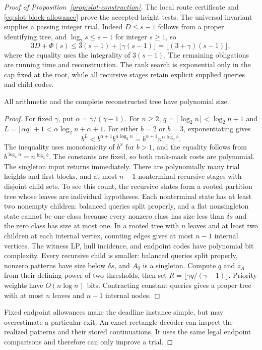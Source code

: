 \begin{proof}[Proof of Proposition~\ref{prop:slot-construction}]
The local route certificate and \eqref{eq:slot-block-allowance} prove
the accepted-height tests. The universal invariant supplies a passing
integer trial. Indeed $D\le s-1$ follows from a proper identifying
tree, and $\log_2s\le s-1$ for integer $s\ge1$, so
\[
 3D+\Phi(s)
 \le3(s-1)+\lfloor\gamma(s-1)\rfloor
 =\lfloor(3+\gamma)(s-1)\rfloor,
\]
where the equality uses the integrality of $3(s-1)$.
The remaining obligations are running time and reconstruction. The
rank search is exponential only in the cap fixed at the root, while
all recursive stages retain explicit supplied queries and child codes.

\begin{claim}
All arithmetic and the complete reconstructed tree have polynomial size.
\end{claim}
\begin{proof}
For fixed $\gamma$, put $\alpha=\gamma/(\gamma-1)$.
For $n\ge2$, $q=\lceil\log_2n\rceil<\log_2n+1$ and
$L=\lfloor\alpha q\rfloor+1<\alpha\log_2n+\alpha+1$.
For either $b=2$ or $b=3$, exponentiating gives
\[
 b^L<b^{\alpha+1}b^{\alpha\log_2n}
     =b^{\alpha+1}n^{\alpha\log_2b}.
\]
The inequality uses monotonicity of $b^x$ for $b>1$, and the
equality follows from $b^{\log_2n}=n^{\log_2b}$.
The constants are fixed, so both rank-mask costs are polynomial.
The singleton input returns immediately. There are polynomially many
trial heights and first blocks, and at most $n-1$ nonterminal
recursive stages with disjoint child sets. To see this count, the
recursive states form a rooted partition tree whose leaves are
individual hypotheses. Each nonterminal state has at least two
nonempty children: balanced queries split properly, and a flat
nonsingleton state cannot be one class because every nonzero class
has size less than $\delta s$ and the zero class has size at most
one. In a rooted tree with $n$ leaves and at least two children at
each internal vertex, counting edges gives at most $n-1$ internal
vertices. The witness LP, hull
incidence, and endpoint codes have polynomial bit complexity.
Every recursive child is smaller: balanced queries split properly,
nonzero patterns have size below $\delta s$, and $A_0$ is a singleton.
Compute $q$ and $z_A$ from their defining power-of-two thresholds, then
set $R=\lfloor\gamma q/(\gamma-1)\rfloor$. Priority weights
have $O(n\log n)$ bits. Contracting constant queries gives a proper
tree with at most $n$ leaves and $n-1$ internal nodes.
\end{proof}
Fixed endpoint allowances make the deadline instance simple, but may
overestimate a particular exit. An exact rectangle decoder can inspect
the realized patterns and their stored continuations. It uses the same
legal endpoint comparisons and therefore can only improve a trial.


\end{proof}

